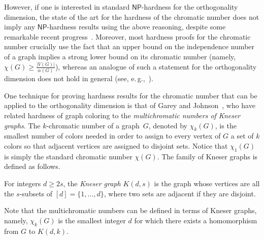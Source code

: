 \documentclass{toc}
\newcommand{\NP}{\mathsf{NP}}
\begin{document}
However, if one is interested in standard $\NP$-hardness for the orthogonality dimension, the state of the art for the hardness of the chromatic number does not imply
%
%
%
any $\NP$-hardness  %
results using the above reasoning, despite some remarkable recent progress~\cite{BartoBKO21,WZ20}.
Moreover, most hardness proofs for the chromatic number crucially use the fact that an upper bound on the independence number of a graph implies a strong lower bound on its chromatic number (namely, $\chi(G) \geq \frac{|V(G)|}{\alpha(G)}$), whereas an analogue of such a statement for the orthogonality dimension does not hold in general (see, e.\,g.,~\cite[Proposition~2.2]{HavivMFCS19}).

One technique for proving hardness results for the chromatic number that can be applied %
to  %
the orthogonality dimension is that of Garey and Johnson~\cite{GareyJ76a}, who have related hardness of graph coloring to the \emph{multichromatic numbers of Kneser graphs}. The
%
$k$-chromatic
number of a graph~$G$, denoted by $\chi_k(G)$, is the smallest number of colors needed in order to assign to every vertex of $G$ a set of $k$ colors so that adjacent vertices are assigned to disjoint sets. Notice that $\chi_1(G)$ is simply the standard chromatic number $\chi(G)$. The family of Kneser graphs is defined as follows.
\begin{definition}\label{def:Kneser}
For integers $d \geq 2s$, the \emph{Kneser graph} $K(d,s)$ is the graph whose vertices are all the $s$-subsets of $[d]=\{1,\ldots,d\}$, where two sets are adjacent if they are disjoint.
\end{definition}
\noindent
Note that the multichromatic numbers can be defined in terms of Kneser graphs, namely, $\chi_k(G)$ is the smallest integer $d$ for which there exists a homomorphism from $G$ to $K(d,k)$.
\end{document}
